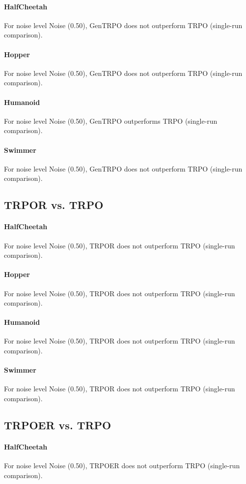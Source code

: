 \paragraph{HalfCheetah}
For noise level Noise (0.50), GenTRPO does not outperform TRPO (single-run comparison).
\paragraph{Hopper}
For noise level Noise (0.50), GenTRPO does not outperform TRPO (single-run comparison).
\paragraph{Humanoid}
For noise level Noise (0.50), GenTRPO outperforms TRPO (single-run comparison).
\paragraph{Swimmer}
For noise level Noise (0.50), GenTRPO does not outperform TRPO (single-run comparison).
\subsection{TRPOR vs. TRPO}
\paragraph{HalfCheetah}
For noise level Noise (0.50), TRPOR does not outperform TRPO (single-run comparison).
\paragraph{Hopper}
For noise level Noise (0.50), TRPOR does not outperform TRPO (single-run comparison).
\paragraph{Humanoid}
For noise level Noise (0.50), TRPOR does not outperform TRPO (single-run comparison).
\paragraph{Swimmer}
For noise level Noise (0.50), TRPOR does not outperform TRPO (single-run comparison).
\subsection{TRPOER vs. TRPO}
\paragraph{HalfCheetah}
For noise level Noise (0.50), TRPOER does not outperform TRPO (single-run comparison).
